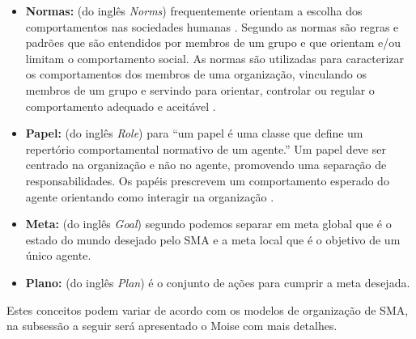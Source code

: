 \begin{itemize}

\item \textbf{Normas:} (do inglês \textit{Norms}) frequentemente orientam a escolha dos comportamentos nas sociedades humanas \cite{sen2007emergence}. Segundo \citet{cialdini1998social} as normas são regras e padrões que são entendidos por membros de um grupo e que orientam e/ou limitam o comportamento social. As normas são utilizadas para caracterizar os comportamentos dos membros de uma organização, vinculando os membros de um grupo e servindo para orientar, controlar ou regular o comportamento adequado e aceitável \cite{jennings2000agent}.

\item \textbf{Papel:} (do inglês \textit{Role}) para \citet{odell2002role} “um papel é uma classe que define um repertório comportamental normativo de um agente.” Um papel deve ser centrado na organização e não no agente, promovendo uma separação de responsabilidades. Os papéis prescrevem um comportamento esperado do agente orientando como interagir na organização \cite{tinnemeier2009roles}.

\item \textbf{Meta:} (do inglês \textit{Goal}) segundo \cite{hubner2003modelo} podemos separar em meta global que é o estado do mundo desejado pelo SMA e a meta local que é o objetivo de um único agente.

\item \textbf{Plano:} (do inglês \textit{Plan}) é o conjunto de ações para cumprir a meta desejada.
\end{itemize}

Estes conceitos podem variar de acordo com os modelos de organização de SMA, na subsessão a seguir será apresentado o Moise com mais detalhes.




